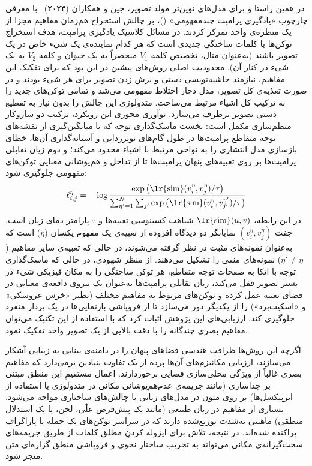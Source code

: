 در همین راستا و برای مدل‌های نوین‌تر مولد تصویر، جین و همکاران (۲۰۲۴)~\cite{jin2024animage} با معرفی چارچوب «یادگیری پرامپت چندمفهومی» ()، بر چالش استخراج هم‌زمان مفاهیم مجزا از یک منظره‌ی واحد تمرکز کردند. در مسائل کلاسیک یادگیری پرامپت، هدف استخراج توکن‌ها یا کلمات ساختگی جدیدی است که هر کدام نماینده‌ی یک شیء خاص در یک تصویر باشند (به‌عنوان مثال، تخصیص کلمه $V_1$ منحصراً به یک حیوان و کلمه $V_2$ به یک شیء در کنار آن). محدودیت اصلی روش‌های پیشین در این بود که برای تفکیک این مفاهیم، نیازمند حاشیه‌نویسی دستی و برش زدن تصویر برای هر شیء بودند و در صورت تغذیه‌ی کل تصویر، مدل دچار اختلاط مفهومی می‌شد و تمامی توکن‌های جدید را به ترکیب کل اشیاء مرتبط می‌ساخت. متدولوژی  این چالش را بدون نیاز به تقطیع دستی تصویر برطرف می‌سازد. نوآوری محوری این رویکرد، ترکیب دو سازوکار منظم‌سازی مکمل است: نخست ماسک‌گذاری توجه که با میانگین‌گیری از نقشه‌های توجه متقاطع پرامپت‌ها در طول گام‌های نویززدایی و آستانه‌گذاری آن‌ها، خطای بازسازی مدل انتشاری را به نواحی مرتبط با اشیاء محدود می‌کند؛ و دوم زیان تقابلی پرامپت‌ها بر روی تعبیه‌های پنهان پرامپت‌ها تا از تداخل و هم‌پوشانی معنایی توکن‌های مفهومی جلوگیری شود:
\begin{equation}\label{eq:chap3_mcpl}
    \ell_{i,j}^{\eta} = -\log \frac{\exp\big(\text{\lr{sim}}(v_i^\eta, v_j^\eta)/\tau\big)}{\sum_{\eta'=1}^N \sum_{j'} \exp\big(\text{\lr{sim}}(v_i^\eta, v_{j'}^{\eta'})/\tau\big)}
\end{equation}
در این رابطه، $\text{\lr{sim}}(u,v)$ شباهت کسینوسی تعبیه‌ها و $\tau$ پارامتر دمای زیان  است. جفت $(v_i^\eta, v_j^\eta)$ نمایانگر دو دیدگاه افزوده از تعبیه‌ی یک مفهوم یکسان ($\eta$) است که به‌عنوان نمونه‌های مثبت در نظر گرفته می‌شوند، در حالی که تعبیه‌ی سایر مفاهیم ($\eta' \neq \eta$) نمونه‌های منفی را تشکیل می‌دهند. از منظر شهودی، در حالی که ماسک‌گذاری توجه با اتکا به صفحات توجه متقاطع، هر توکن ساختگی را به مکان فیزیکی شیء در بستر تصویر قفل می‌کند، زیان تقابلی پرامپت‌ها به‌عنوان یک نیروی دافعه‌ی معنایی در فضای تعبیه عمل کرده و توکن‌های مربوط به مفاهیم مختلف (نظیر «خرس عروسکی» و «اسکیت‌برد») را از یکدیگر دور می‌سازد تا از فروپاشی بازنمایی‌ها در یک بردار منفرد جلوگیری کند. ارزیابی‌های این پژوهش اثبات کرد که با استفاده از این تکنیک می‌توان مفاهیم بصری چندگانه را با دقت بالایی از یک تصویر واحد تفکیک نمود.

اگرچه این روش‌ها ظرافت هندسی فضاهای پنهان را در دامنه‌ی بینایی به زیبایی آشکار می‌سازند، ارزیابی مکانیزم‌های آن‌ها پرده از یک تفاوت بنیادین برمی‌دارد که مفاهیم بصری غالباً از ویژگی محلی‌سازی فضایی برخوردارند. اعمال مستقیمِ این منطق مبتنی بر جداسازی (مانند جریمه‌ی عدم‌هم‌پوشانی مکانی در متدولوژی  یا استفاده از ابرپیکسل‌ها) بر روی متون در مدل‌های زبانی با چالش‌های ساختاری مواجه می‌شود. بسیاری از مفاهیم در زبان طبیعی (مانند یک پیش‌فرض علّی، لحن، یا یک استدلال منطقی) ماهیتی به‌شدت توزیع‌شده دارند که در سراسر توکن‌های یک جمله یا پاراگراف پراکنده شده‌اند. در نتیجه، تلاش برای ایزوله کردنِ مطلق کلمات از طریق جریمه‌های سخت‌گیرانه‌ی مکانی می‌تواند به تخریب ساختار نحوی و فروپاشی منطق گزاره‌ای متن منجر شود.

